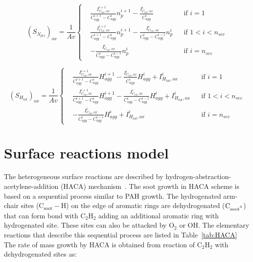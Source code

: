 \begin{equation}
	\left(S_{N_{pri}}\right)_{ox}=
	\frac{1}{Av}
	\left\{
	\begin{aligned}
		&\frac{I^{i+1}_{C_{tot},ox}}{C^{i+1}_{agg}-C^{i}_{agg}}n^{i+1}_p
		-
		\frac{I^{i}_{C_{tot},ox}}{C^{i}_{agg}}
		&&
		\text{if } i = 1
		\\
		&\frac{I^{i+1}_{C_{tot},ox}}{C^{i+1}_{agg}-C^{i}_{agg}}n^{i+1}_p
		-
		\frac{I^{i}_{C_{tot},ox}}{C^{i}_{agg}-C^{i-1}_{agg}}n^{i}_p
		&&
		\text{if } 1 < i < n_{sec}
		\\
		&
		-
		\frac{I^{i}_{C_{tot},ox}}{C^{i}_{agg}-C^{i-1}_{agg}}n^{i}_p
		&&\text{if } i=n_{sec}
	\end{aligned}
	\right.
	\label{eqn:S_Npri_oxsect}
\end{equation}

\begin{equation}
	\left(S_{H_{tot}}\right)_{ox}=
	\frac{1}{Av}
	\left\{
	\begin{aligned}
		&\frac{I^{i+1}_{C_{tot},ox}}{C^{i+1}_{agg}-C^{i}_{agg}}H^{i+1}_{agg}
		-
		\frac{I^{i}_{C_{tot},ox}}{C^{i}_{agg}}H^{i}_{agg}
		+ I^{i}_{H_{tot}, ox}
		&&
		\text{if } i = 1
		\\
		&\frac{I^{i+1}_{C_{tot},ox}}{C^{i+1}_{agg}-C^{i}_{agg}}H^{i+1}_{agg}
		-
		\frac{I^{i}_{C_{tot},ox}}{C^{i}_{agg}-C^{i-1}_{agg}}H^{i}_{agg}
		+ I^{i}_{H_{tot}, ox}
		&&
		\text{if } 1 < i < n_{sec}
		\\
		&
		-
		\frac{I^{i}_{C_{tot},ox}}{C^{i}_{agg}-C^{i-1}_{agg}}H^{i}_{agg}
		+ I^{i}_{H_{tot}, ox}
		&&\text{if } i=n_{sec}
	\end{aligned}
	\right.
	\label{eqn:S_Htot_oxsect}
\end{equation}

\section{Surface reactions model}
\label{sec:surfreacmodel}
The heterogeneous surface reactions are described by hydrogen-abstraction-acetylene-addition (HACA) mechanism~\citep{frenklach1991detailed, appel2000kinetic}. The soot growth in HACA scheme is based on a sequential process similar to PAH growth. The hydrogenated arm-chair sites ($\mathrm{C_{soot}-H}$) on the edge of aromatic rings are dehydrogenated ($\mathrm{C_{soot\mbox{\textdegree}}}$)  that can form bond with  $\mathrm{C_2H_2}$ adding an additional aromatic ring with hydrogenated site. These sites can also be attacked by $\mathrm{O_2}$ or $\mathrm{OH}$. The elementary reactions that describe this sequential process are listed in Table~\ref{tab:HACA}
The rate of mass growth by HACA is obtained from reaction of $\mathrm{C_2H_2}$ with dehydrogenated sites as:

